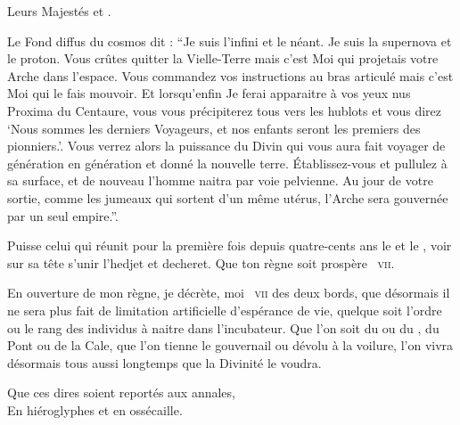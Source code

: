 \begin{drama}
  \huissierspeaks Leurs Majestés \elena et \ela.


  \pretrespeaks {} Le Fond diffus du cosmos dit : \enquote{Je suis l’infini et le néant. Je suis la supernova et le proton. Vous crûtes quitter la Vielle-Terre mais c’est Moi qui projetais votre Arche dans l’espace. Vous commandez vos instructions au bras articulé mais c’est Moi qui le fais mouvoir. Et lorsqu’enfin Je ferai apparaitre à vos yeux nus Proxima du Centaure, vous vous précipiterez tous vers les hublots et vous direz \enquote{Nous sommes les derniers Voyageurs, et nos enfants seront les premiers des pionniers.}. Vous verrez alors la puissance du Divin qui vous aura fait voyager de génération en génération et donné la nouvelle terre. Établissez-vous et pullulez à sa surface, et de nouveau l’homme naitra par voie pelvienne. Au jour de votre sortie, comme les jumeaux qui sortent d’un même utérus, l’Arche sera gouvernée par un seul empire.}.


   Puisse celui qui réunit pour la première fois depuis quatre-cents ans le \campprincipal{} et le \campoppose{}, voir sur sa tête s’unir l’hedjet et decheret. Que ton règne soit prospère \elena~\textsc{vii}.

  \elenaspeaks En ouverture de mon règne, je décrète, moi \elena~\textsc{vii} des deux bords, que désormais il ne sera plus fait de limitation artificielle d’espérance de vie, quelque soit l’ordre ou le rang des individus à naitre dans l’incubateur. Que l’on soit du \campprincipal{} ou du \campoppose{}, du Pont ou de la Cale, que l’on tienne le gouvernail ou dévolu à la voilure, l’on vivra désormais tous aussi longtemps que la Divinité le voudra.

  \begin{minipage}[t]{\linewidth}
    Que ces dires soient reportés aux annales,\\
    En hiéroglyphes et en ossécaille.
  \end{minipage}


\end{drama}
